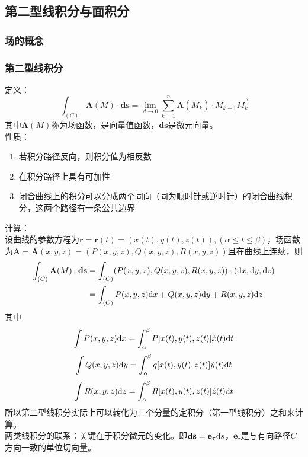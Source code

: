 \subsection{第二型线积分与面积分}
\subsubsection{场的概念}
\subsubsection{第二型线积分}
定义：
\begin{equation}\label{key}
	\int_{(C)} \mathbf{A}(M)\cdot \mathbf{ds}=\lim_{d\to 0}\sum_{k=1}^{n}\mathbf{A}(\overline{M_k})\cdot \overrightarrow{M_{k-1}M_k}
\end{equation}
其中$\mathbf{A}(M)$称为场函数，是向量值函数，$\mathbf{ds}$是微元向量。\\
性质：\\
\begin{enumerate}
	\item 
	若积分路径反向，则积分值为相反数
	\item
	在积分路径上具有可加性
	\item
	闭合曲线上的积分可以分成两个同向（同为顺时针或逆时针）的闭合曲线积分，这两个路径有一条公共边界
\end{enumerate}
计算：\\
设曲线的参数方程为$\mathbf{r}=\textbf{r}(t)=(x(t),y(t),z(t)),(\alpha\leq t\leq \beta)$，场函数为$\textbf{A}=\textbf{A}(x,y,z)=(P(x,y,z),Q(x,y,z),R(x,y,z))$且在曲线上连续，则
\begin{align*}\label{key}
	\int_{(C)} \mathbf{A}(M)\cdot \mathbf{ds}	&=\int_{(C)}(P(x,y,z),Q(x,y,z),R(x,y,z))\cdot (\mathrm{d} x,\mathrm{d} y,\mathrm{d} z)\\
	&=\int_{(C)}P(x,y,z)\mathrm{d} x+Q(x,y,z)\mathrm{d} y+R(x,y,z)\mathrm{d} z
\end{align*}
其中
\begin{equation}\label{key}
	\int P(x,y,z)\mathrm{d} x= \int_{\alpha}^{\beta}P[x(t),y(t),z(t)]\dot{x}(t)\mathrm{d} t
\end{equation}
\begin{equation}\label{key}
	\int Q(x,y,z)\mathrm{d} y= \int_{\alpha}^{\beta}q[x(t),y(t),z(t)]\dot{y}(t)\mathrm{d} t
\end{equation}
\begin{equation}\label{key}
	\int R(x,y,z)\mathrm{d} z= \int_{\alpha}^{\beta}R[x(t),y(t),z(t)]\dot{z}(t)\mathrm{d} t
\end{equation}
所以第二型线积分实际上可以转化为三个分量的定积分（第一型线积分）之和来计算。\\
两类线积分的联系：关键在于积分微元的变化。即$\textbf{ds}=\textbf{e}_\tau \mathrm{d} s$，$\textbf{e}_\tau$是与有向路径$C$方向一致的单位切向量。


